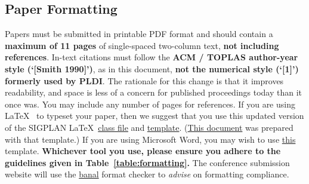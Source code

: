 \documentclass[pldi]{sigplanconf}
\begin{document}
\subsection{Paper Formatting}

Papers must be submitted in printable PDF format and should contain a
\textbf{maximum of 11 pages} of single-spaced two-column text,
\textbf{not including references}.  In-text citations must follow the
\textbf{ACM / TOPLAS author-year style (`[Smith 1990]')}, as in this
document, \textbf{not the numerical style (`[1]') formerly used by
  PLDI}.  The rationale for this change is that it improves
readability, and space is less of a concern for published proceedings
today than it once was.  You may include any number of pages for
references.  If you are using
\LaTeX~\cite{Lamport:94} to typeset your paper, then we suggest that
you use this updated version of the SIGPLAN 
\LaTeX~\href{http://conf.researchr.org/getImage/pldi2015/orig/sigplanconf.cls}{class
  file} and
\href{http://conf.researchr.org/getImage/pldi2015/orig/pldi15-template.tex}{template}.
(\href{http://conf.researchr.org/getImage/pldi2015/orig/pldi15-template.pdf}{This
  document} was prepared with that template.)  If you are using
Microsoft Word, you may wish to use
\href{http://conf.researchr.org/getImage/pldi2015/orig/pldi15-word-template.dot}{this}
template.  \textbf{Whichever tool you use, please ensure you adhere to the
guidelines given in Table~\ref{table:formatting}.}  The conference
submission website will use the
\href{https://www.usenix.org/legacy/event/wowcs08/tech/full_papers/voelker/voelker.pdf}{banal}
format checker to \emph{advise} on formatting compliance.
\end{document}
